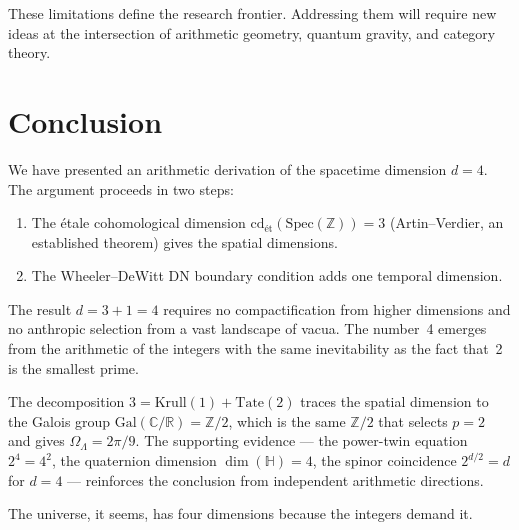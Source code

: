 \documentclass[12pt,a4paper]{article}
\theoremstyle{definition}
\newcommand{\Spec}{\mathrm{Spec}}
\newcommand{\Gal}{\mathrm{Gal}}
\newcommand{\cd}{\mathrm{cd}}
\newcommand{\Krull}{\mathrm{Krull}}
\newcommand{\ZZ}{\mathbb{Z}}
\newcommand{\RR}{\mathbb{R}}
\newcommand{\CC}{\mathbb{C}}
\newcommand{\HH}{\mathbb{H}}
\begin{document}
These limitations define the research frontier. Addressing them will require new ideas
at the intersection of arithmetic geometry, quantum gravity, and category theory.

\section{Conclusion}\label{sec:conclusion}

We have presented an arithmetic derivation of the spacetime dimension $d=4$. The
argument proceeds in two steps:
\begin{enumerate}
  \item The \'etale cohomological dimension $\cd_{\text{\'et}}(\Spec(\ZZ)) = 3$
    (Artin--Verdier, an established theorem) gives the spatial dimensions.
  \item The Wheeler--DeWitt DN boundary condition adds one temporal dimension.
\end{enumerate}

The result $d = 3 + 1 = 4$ requires no compactification from higher dimensions and
no anthropic selection from a vast landscape of vacua. The number~4 emerges from the
arithmetic of the integers with the same inevitability as the fact that~2 is the
smallest prime.

The decomposition $3 = \Krull(1) + \mathrm{Tate}(2)$ traces the spatial dimension
to the Galois group $\Gal(\CC/\RR) = \ZZ/2$, which is the same $\ZZ/2$ that selects
$p=2$ and gives $\Omega_\Lambda = 2\pi/9$. The supporting evidence --- the power-twin
equation $2^4 = 4^2$, the quaternion dimension $\dim(\HH) = 4$, the spinor coincidence
$2^{d/2} = d$ for $d=4$ --- reinforces the conclusion from independent arithmetic
directions.

The universe, it seems, has four dimensions because the integers demand it.

\end{document}

